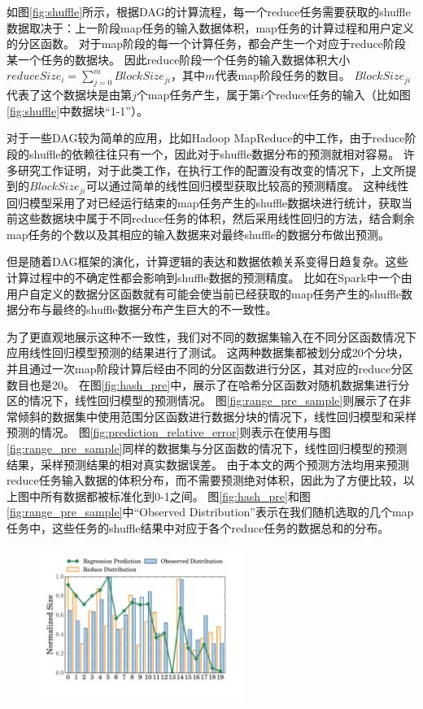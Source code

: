 如图\ref{fig:shuffle}所示，根据DAG的计算流程，每一个reduce任务需要获取的shuffle数据取决于：上一阶段map任务的输入数据体积，map任务的计算过程和用户定义的分区函数。
对于map阶段的每一个计算任务，都会产生一个对应于reduce阶段某一个任务的数据块。
因此reduce阶段一个任务的输入数据体积大小$reduceSize_i = \sum_{j=0}^{m} {BlockSize_{ji}}$，其中$m$代表map阶段任务的数目。
$BlockSize_{ji}$代表了这个数据块是由第$j$个map任务产生，属于第$i$个reduce任务的输入（比如图\ref{fig:shuffle}中数据块“1-1”）。

对于一些DAG较为简单的应用，比如Hadoop MapReduce的中工作\cite{hadoop}，由于reduce阶段的shuffle的依赖往往只有一个，因此对于shuffle数据分布的预测就相对容易。
许多研究工作证明，对于此类工作，在执行工作的配置没有改变的情况下，上文所提到的$BlockSize_{ji}$可以通过简单的线性回归模型获取比较高的预测精度\cite{ishuffle, predict}。
这种线性回归模型采用了对已经运行结束的map任务产生的shuffle数据块进行统计，获取当前这些数据块中属于不同reduce任务的体积，然后采用线性回归的方法，结合剩余map任务的个数以及其相应的输入数据来对最终shuffle的数据分布做出预测。

但是随着DAG框架的演化，计算逻辑的表达和数据依赖关系变得日趋复杂。这些计算过程中的不确定性都会影响到shuffle数据的预测精度。
比如在Spark中一个由用户自定义的数据分区函数就有可能会使当前已经获取的map任务产生的shuffle数据分布与最终的shuffle数据分布产生巨大的不一致性。

为了更直观地展示这种不一致性，我们对不同的数据集输入在不同分区函数情况下应用线性回归模型预测的结果进行了测试。
这两种数据集都被划分成20个分块，并且通过一次map阶段计算后经由不同的分区函数进行分区，其对应的reduce分区数目也是20。
在图\ref{fig:hash_pre}中，展示了在哈希分区函数对随机数据集进行分区的情况下，线性回归模型的预测情况。
图\ref{fig:range_pre_sample}则展示了在非常倾斜的数据集中使用范围分区函数进行数据分块的情况下，线性回归模型和采样预测的情况。
图\ref{fig:prediction_relative_error}则表示在使用与图\ref{fig:range_pre_sample}同样的数据集与分区函数的情况下，线性回归模型的预测结果，采样预测结果的相对真实数据误差。
由于本文的两个预测方法均用来预测reduce任务输入数据的体积分布，而不需要预测绝对体积，因此为了方便比较，以上图中所有数据都被标准化到0-1之间。
图\ref{fig:hash_pre}和图\ref{fig:range_pre_sample}中“Observed Distribution”表示在我们随机选取的几个map任务中，这些任务的shuffle结果中对应于各个reduce任务的数据总和的分布。

\begin{figure}[!htp]
    \centering
    \includegraphics[width=0.6\textwidth]{../../PPoPP-2018/fig/hash_pre.pdf}
\end{figure}

